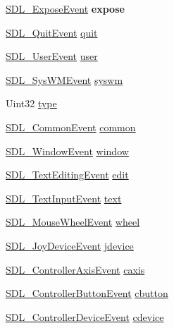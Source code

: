 \begin{DoxyCompactItemize}
\item 
\hypertarget{unionSDL__Event_ae70b3cbeb6e05e3e1322a906c9fbe7d5}{\hyperlink{structSDL__ExposeEvent}{S\+D\+L\+\_\+\+Expose\+Event} {\bfseries expose}}\label{unionSDL__Event_ae70b3cbeb6e05e3e1322a906c9fbe7d5}

\item 
\hyperlink{structSDL__QuitEvent}{S\+D\+L\+\_\+\+Quit\+Event} \hyperlink{unionSDL__Event_a102a3008afe67a1c02ae7504e232dcef}{quit}
\item 
\hyperlink{structSDL__UserEvent}{S\+D\+L\+\_\+\+User\+Event} \hyperlink{unionSDL__Event_ab7c394e3ce7bf1e4f8d68bc0e9f1b042}{user}
\item 
\hyperlink{structSDL__SysWMEvent}{S\+D\+L\+\_\+\+Sys\+W\+M\+Event} \hyperlink{unionSDL__Event_ab3b2eaf5348d4c50a51b1f297fdef537}{syswm}
\item 
Uint32 \hyperlink{unionSDL__Event_a237648bec242d2d5835f1a4250ddfa46}{type}
\item 
\hyperlink{structSDL__CommonEvent}{S\+D\+L\+\_\+\+Common\+Event} \hyperlink{unionSDL__Event_abe5cb8767f93de55163c8ddd4562a7f2}{common}
\item 
\hyperlink{structSDL__WindowEvent}{S\+D\+L\+\_\+\+Window\+Event} \hyperlink{unionSDL__Event_a826936b3275406d857bc6654669fae71}{window}
\item 
\hyperlink{structSDL__TextEditingEvent}{S\+D\+L\+\_\+\+Text\+Editing\+Event} \hyperlink{unionSDL__Event_a9a7e3b67b2654d4c5fc509676c6a7183}{edit}
\item 
\hyperlink{structSDL__TextInputEvent}{S\+D\+L\+\_\+\+Text\+Input\+Event} \hyperlink{unionSDL__Event_aa4fc65c559d69f33c057c0c23d8414b8}{text}
\item 
\hyperlink{structSDL__MouseWheelEvent}{S\+D\+L\+\_\+\+Mouse\+Wheel\+Event} \hyperlink{unionSDL__Event_a267d3f550715519ec90a81ccd0e6cbda}{wheel}
\item 
\hyperlink{structSDL__JoyDeviceEvent}{S\+D\+L\+\_\+\+Joy\+Device\+Event} \hyperlink{unionSDL__Event_a17514dc19a846ea1b5fbe44123700c4c}{jdevice}
\item 
\hyperlink{structSDL__ControllerAxisEvent}{S\+D\+L\+\_\+\+Controller\+Axis\+Event} \hyperlink{unionSDL__Event_aa8f6df0f2716fae56204b12ab4a4c289}{caxis}
\item 
\hyperlink{structSDL__ControllerButtonEvent}{S\+D\+L\+\_\+\+Controller\+Button\+Event} \hyperlink{unionSDL__Event_aee2b5671c8dcdb447023715cc21593cb}{cbutton}
\item 
\hyperlink{structSDL__ControllerDeviceEvent}{S\+D\+L\+\_\+\+Controller\+Device\+Event} \hyperlink{unionSDL__Event_ad3beed01e690b885728e0b0e1d636378}{cdevice}

\end{DoxyCompactItemize}
